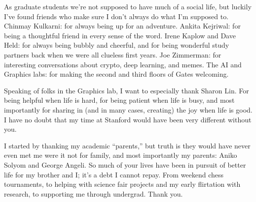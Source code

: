 As graduate students we're not supposed to have much of a social life, but luckily I've
  found friends who make sure I don't always do what I'm supposed to.
Chinmay Kulkarni: for always being up for an adventure.
Ankita Kejriwal: for being a thoughtful friend in every sense of the word.
Irene Kaplow and Dave Held: for always being bubbly and cheerful, and for being wonderful study partners
  back when we were all clueless first years.
Joe Zimmerman: for interesting conversations about crypto, deep learning, and memes.
The AI and Graphics labs: for making the second and third floors of Gates welcoming.

Speaking of folks in the Graphics lab, I want to especially thank Sharon Lin.
For being helpful when life is hard, for being patient when life is busy, and most importantly
  for sharing in (and in many cases, creating) the joy when life is good.
I have no doubt that my time at Stanford would have been very different without you.

I started by thanking my academic ``parents,'' but truth is they would have never
  even met me were it not for family, and most importantly my parents: Aniko Solyom and George Angeli.
So much of your lives have been in pursuit of better life for my brother and I; it's a debt I cannot
  repay.
From weekend chess tournaments, to helping with science fair projects and my early flirtation with research,
  to supporting me through undergrad.
Thank you.
